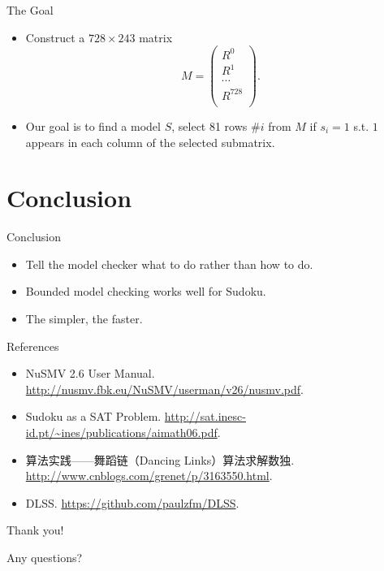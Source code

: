 \documentclass[11pt]{beamer}
\renewcommand{\r}{\alert}
\theoremstyle{definition}
\begin{document}
\begin{frame}{The Goal}
    \begin{itemize}
        \item Construct a $728 \times 243$ matrix $$M = \left(
        \begin{array}{c}
            R^{0} \\
            R^{1} \\
            \cdots \\
            R^{728} \\
        \end{array}\right).$$
        \item Our goal is to find a model $S$, select 81 rows \#$i$ from $M$ if $s_i=1$ s.t. $1$ appears in each column of the selected submatrix.
    \end{itemize}
\end{frame}

\section{Conclusion}

\begin{frame}{Conclusion}
    \begin{itemize}
        \item Tell the model checker \r{what to do} rather than how to do.
        \item \r{Bounded model checking} works well for Sudoku.
        \item The \r{simpler}, the faster.
    \end{itemize}
\end{frame}

\begin{frame}{References}
    \begin{itemize}
        \item NuSMV 2.6 User Manual. \url{http://nusmv.fbk.eu/NuSMV/userman/v26/nusmv.pdf}.
        \item Sudoku as a SAT Problem. \url{http://sat.inesc-id.pt/~ines/publications/aimath06.pdf}.
        \item 算法实践——舞蹈链（Dancing Links）算法求解数独. \url{http://www.cnblogs.com/grenet/p/3163550.html}.
        \item DLSS. \url{https://github.com/paulzfm/DLSS}.
    \end{itemize}
\end{frame}

\begin{frame}
    \begin{center}
        {\huge \color{darkgreen}
            Thank you!
        }
    \end{center}

    \begin{center}
        {\huge \color{darkgreen}
            Any questions?
        }
    \end{center}
\end{frame}
\end{document}
